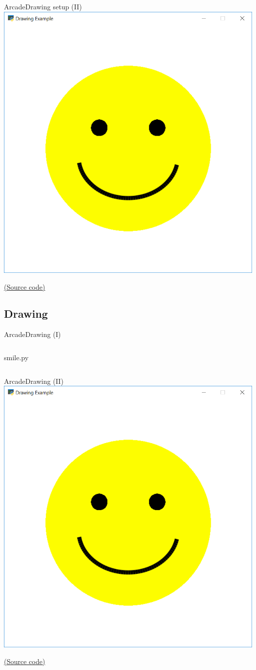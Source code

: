 \documentclass[10pt,compress]{beamer} %
\begin{document}
\begin{frame}{Arcade}{Drawing setup (II)}
	\centering \includegraphics[width=0.5\linewidth]{figs/smile.png}
    \bigskip

    \href{https://api.arcade.academy/en/latest/examples/happy_face.html}{(Source code)}
\end{frame}

\subsection{Drawing}
\begin{frame}{Arcade}{Drawing (I)}
	\begin{columns}
 	   \column{\textwidth}
		\vspace{-0.2cm}
		\begin{exampleblock}{smile.py}
		\vspace{-0.2cm}
		
		\vspace{-0.2cm}
		\end{exampleblock}
	\end{columns}
\end{frame}

\begin{frame}{Arcade}{Drawing (II)}
	\centering \includegraphics[width=0.5\linewidth]{figs/smile.png}
    \bigskip

    \href{https://api.arcade.academy/en/latest/examples/happy_face.html}{(Source code)}
\end{frame}
\end{document}
